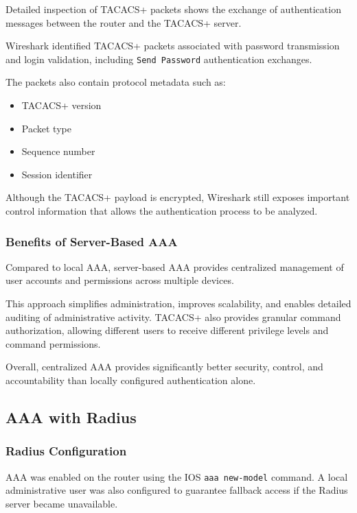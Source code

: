\documentclass[12pt]{article}
\begin{document}
Detailed inspection of TACACS+ packets shows
the exchange of authentication messages between
the router and the TACACS+ server.

Wireshark identified TACACS+ packets associated
with password transmission and login validation,
including \texttt{Send Password} authentication exchanges.

The packets also contain protocol metadata such as:

\begin{itemize}
\item TACACS+ version
\item Packet type
\item Sequence number
\item Session identifier
\end{itemize}

Although the TACACS+ payload is encrypted,
Wireshark still exposes important control information
that allows the authentication process to be analyzed.

\subsubsection{Benefits of Server-Based AAA}

Compared to local AAA, server-based AAA provides centralized
management of user accounts and permissions across multiple devices.

This approach simplifies administration, improves scalability,
and enables detailed auditing of administrative activity.
TACACS+ also provides granular command authorization,
allowing different users to receive different privilege levels
and command permissions.

Overall, centralized AAA provides significantly better security,
control, and accountability than locally configured
authentication alone.

\subsection{AAA with Radius}

\subsubsection{Radius Configuration}

AAA was enabled on the router using the IOS \texttt{aaa new-model} command. A local administrative user was also configured to guarantee fallback access if the Radius server became unavailable.
\end{document}
